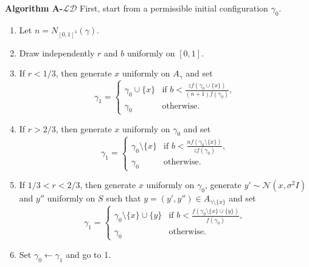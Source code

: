 \noindent \textbf{Algorithm A-$\mathcal{LD}$} \newline
\noindent First, start from a permissible initial configuration $\gamma_0$.
\begin{enumerate}
	\item Let $n = N_{[0,1]^3}(\gamma)$.
    \item Draw independently $r$ and $b$ uniformly on $[0,1]$.
    \item If $r<1/3$, then generate $x$ uniformly on $A_\gamma$ and set
        \begin{equation}\label{birth}
        \gamma_1 = 
        \left\{
            \begin{array}{ll}
                \gamma_0 \cup \{x\} & \mbox{if }  b < \frac{z f(\gamma_0 \cup \{x\})}{(n+1)f(\gamma_0)}, \\
                \gamma_0 & \mbox{otherwise. }
            \end{array}
        \right. 
        \end{equation}
    \item If $r>2/3$, then generate $x$ uniformly on $\gamma_0$ and set
        \begin{equation}\label{death}
        \gamma_1 = 
        \left\{
            \begin{array}{ll}
                \gamma_0 \setminus \{x\} & \mbox{if }  b < \frac{n f(\gamma_0 \setminus \{x\})}{zf(\gamma_0)}, \\
                \gamma_0 & \mbox{otherwise. }
            \end{array}
        \right. 
        \end{equation}
    \item If $1/3 < r < 2/3$, then generate $x$ uniformly on $\gamma_0$, generate $y'\sim \mathcal N (x, \sigma^2 I)$ and $y''$ uniformly on $S$ such that $y=(y',y'') \in A_{\gamma \setminus \{x\}}$ and set
        \begin{equation}\label{move}
        \gamma_1 = 
        \left\{
            \begin{array}{ll}
                \gamma_0 \setminus \{x\} \cup \{y\} & \mbox{if }  b < \frac{f(\gamma_0 \setminus \{x\} \cup \{y\})}{f(\gamma_0)}, \\
                \gamma_0 & \mbox{otherwise. }
            \end{array}
        \right. 
        \end{equation}
    \item Set $\gamma_0 \leftarrow \gamma_1$ and go to 1.
\end{enumerate}

